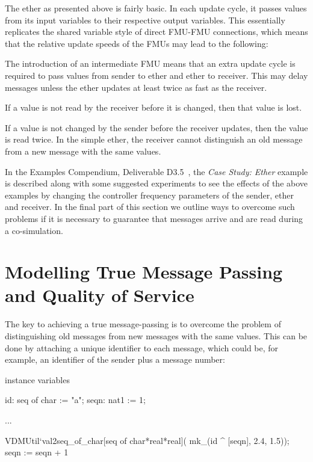 The ether as presented above %
is fairly basic. In each update cycle, it passes values from its input variables to their respective output variables. This essentially replicates the shared variable style of direct FMU-FMU connections, which means that the relative update speeds of the FMUs may lead to the following:

\begin{description}[noitemsep]
  \item[Values may be delayed] The introduction of an intermediate FMU means that an extra update cycle is required to pass values from sender to ether and ether to receiver. This may delay messages unless the ether updates at least twice as fast as the receiver.
  \item[Values may not be read] If a value is not read by the receiver before it is changed, then that value is lost.
  \item[Values may be read more than once] If a value is not changed by the sender before the receiver updates, then the value is read twice. In the simple ether, the receiver cannot distinguish an old message from a new message with the same values.
\end{description}

In the Examples Compendium, Deliverable D3.5~\cite{INTOCPSD3.5}, the \emph{Case Study: Ether} example is described along with some suggested experiments to see the effects of the above examples by changing the controller frequency parameters of the sender, ether and receiver. In the final part of this section we outline ways to overcome such problems if it is necessary to guarantee that messages arrive and are read during a co-simulation.

\section{Modelling True Message Passing and Quality of Service}

The key to achieving a true message-passing is to overcome the problem of distinguishing old messages from new messages with the same values. This can be done by attaching a unique identifier to each message, which could be, for example, an identifier of the sender plus a message number:

\newpage
\begin{vdm}
instance variables

id: seq of char := "a";
seqn: nat1 := 1;

...

VDMUtil`val2seq_of_char[seq of char*real*real](
  mk_(id ^ [seqn], 2.4, 1.5));
seqn := seqn + 1
\end{vdm}

